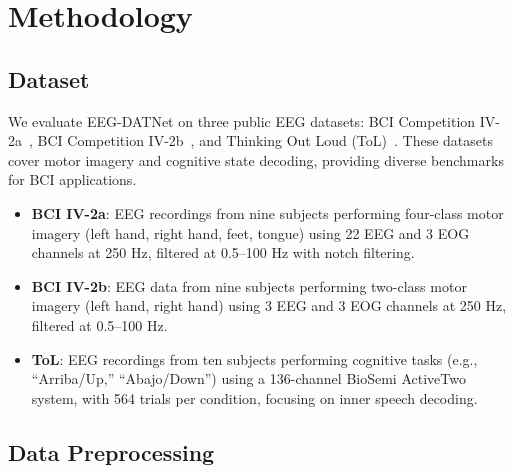 \documentclass[pdflatex,sn-mathphys-num]{sn-jnl}%
\theoremstyle{thmstyleone}
\theoremstyle{thmstyletwo}
\theoremstyle{thmstylethree}
\begin{document}
\section{Methodology}\label{subsec1}

\subsection{Dataset}

We evaluate EEG-DATNet on three public EEG datasets: BCI Competition IV-2a~\cite{tangermann2012review}, BCI Competition IV-2b~\cite{leeb2008graz2b}, and Thinking Out Loud (ToL)~\cite{nieto2022thinking}. These datasets cover motor imagery and cognitive state decoding, providing diverse benchmarks for BCI applications.

\begin{itemize}
    \item \textbf{BCI IV-2a}: EEG recordings from nine subjects performing four-class motor imagery (left hand, right hand, feet, tongue) using 22 EEG and 3 EOG channels at 250 Hz, filtered at 0.5–100 Hz with notch filtering.
    \item \textbf{BCI IV-2b}: EEG data from nine subjects performing two-class motor imagery (left hand, right hand) using 3 EEG and 3 EOG channels at 250 Hz, filtered at 0.5–100 Hz.
    \item \textbf{ToL}: EEG recordings from ten subjects performing cognitive tasks (e.g., “Arriba/Up,” “Abajo/Down”) using a 136-channel BioSemi ActiveTwo system, with 564 trials per condition, focusing on inner speech decoding.
\end{itemize}

\subsection{Data Preprocessing}\label{subsec2}
\end{document}
